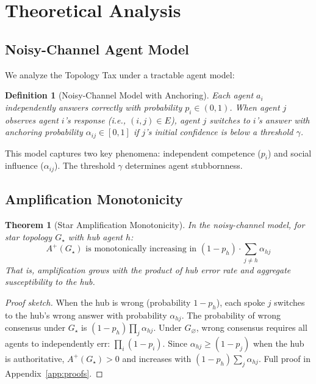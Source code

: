 \documentclass{article}
\newtheorem{theorem}{Theorem}
\newtheorem{definition}{Definition}
\begin{document}
\section{Theoretical Analysis}
\label{sec:theory}

\subsection{Noisy-Channel Agent Model}

We analyze the Topology Tax under a tractable agent model:

\begin{definition}[Noisy-Channel Model with Anchoring]
Each agent $a_i$ independently answers correctly with probability $p_i \in (0,1)$. When agent $j$ observes agent $i$'s response (i.e., $(i,j) \in E$), agent $j$ switches to $i$'s answer with \emph{anchoring probability} $\alpha_{ij} \in [0,1]$ if $j$'s initial confidence is below a threshold $\gamma$.
\end{definition}

This model captures two key phenomena: independent competence ($p_i$) and social influence ($\alpha_{ij}$). The threshold $\gamma$ determines agent stubbornness.

\subsection{Amplification Monotonicity}

\begin{theorem}[Star Amplification Monotonicity]
\label{thm:amplification}
In the noisy-channel model, for star topology $G_\star$ with hub agent $h$:
\begin{equation}
    A^+(G_\star) \text{ is monotonically increasing in } (1 - p_h) \cdot \sum_{j \neq h} \alpha_{hj}
\end{equation}
That is, amplification grows with the product of hub error rate and aggregate susceptibility to the hub.
\end{theorem}

\begin{proof}[Proof sketch]
When the hub is wrong (probability $1-p_h$), each spoke $j$ switches to the hub's wrong answer with probability $\alpha_{hj}$. The probability of wrong consensus under $G_\star$ is $(1-p_h) \prod_j \alpha_{hj}$. Under $G_\varnothing$, wrong consensus requires all agents to independently err: $\prod_i (1-p_i)$. Since $\alpha_{hj} \geq (1-p_j)$ when the hub is authoritative, $A^+(G_\star) > 0$ and increases with $(1-p_h) \sum_j \alpha_{hj}$. Full proof in Appendix~\ref{app:proofs}.
\end{proof}
\end{document}
